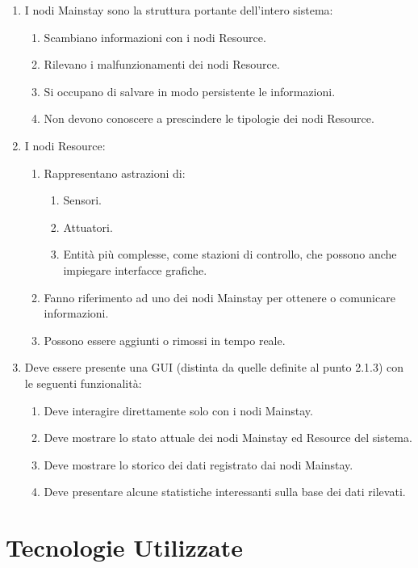 \documentclass[12pt,a4paper,openright,twoside]{book}
\begin{document}
\begin{enumerate}
    \item I nodi Mainstay sono la struttura portante dell'intero sistema:
    \begin{enumerate}
        \item Scambiano informazioni con i nodi Resource.
        \item Rilevano i malfunzionamenti dei nodi Resource.
        \item Si occupano di salvare in modo persistente le informazioni.
        \item Non devono conoscere a prescindere le tipologie dei nodi Resource.
    \end{enumerate}
    \item I nodi Resource:
    \begin{enumerate}
        \item Rappresentano astrazioni di:
        \begin{enumerate}
            \item Sensori.
            \item Attuatori.
            \item Entità più complesse, come stazioni di controllo, che possono anche impiegare interfacce grafiche.
        \end{enumerate}
        \item Fanno riferimento ad uno dei nodi Mainstay per ottenere o comunicare informazioni.
        \item Possono essere aggiunti o rimossi in tempo reale.
    \end{enumerate}
    \item Deve essere presente una GUI (distinta da quelle definite al punto 2.1.3) con le seguenti funzionalità:
    \begin{enumerate}
        \item Deve interagire direttamente solo con i nodi Mainstay.
        \item Deve mostrare lo stato attuale dei nodi Mainstay ed Resource del sistema.
        \item Deve mostrare lo storico dei dati registrato dai nodi Mainstay.
        \item Deve presentare alcune statistiche interessanti sulla base dei dati rilevati.
    \end{enumerate}
\end{enumerate}

\section{Tecnologie Utilizzate}
\end{document}
